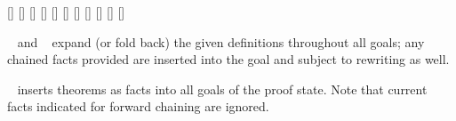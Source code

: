 \begin{isabellebody}
\begin{isamarkuptext}
  \begin{railoutput}
\rail@bar
{}[]
[]
[]
\rail@endbar
{}[]
\rail@end
{}
\rail@bar
{}[]
[]
[]
\rail@endbar
\rail@bar
{}
[]
[]
[]
\rail@endbar
{}[]
\rail@end
\end{railoutput}


  \begin{description}
  
  \item \hyperlink{method.unfold}{\mbox{}}~ and \hyperlink{method.fold}{\mbox{}}~ expand (or fold back) the given definitions throughout
  all goals; any chained facts provided are inserted into the goal and
  subject to rewriting as well.

  \item \hyperlink{method.insert}{\mbox{}}~ inserts theorems as facts
  into all goals of the proof state.  Note that current facts
  indicated for forward chaining are ignored.


\end{description}
\end{isamarkuptext}
\end{isabellebody}
